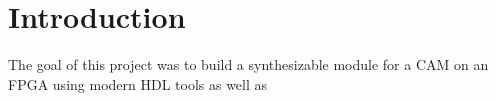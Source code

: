 \section{Introduction}
The goal of this project was to build a synthesizable module for a CAM on an FPGA using modern HDL tools as well as 